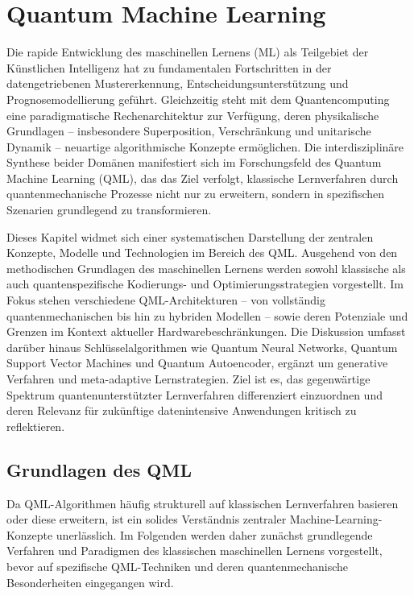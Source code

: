 \chapter{Quantum Machine Learning}



Die rapide Entwicklung des maschinellen Lernens (ML) als Teilgebiet der Künstlichen Intelligenz hat zu fundamentalen Fortschritten in der datengetriebenen Mustererkennung, Entscheidungsunterstützung und Prognosemodellierung geführt. Gleichzeitig steht mit dem Quantencomputing eine paradigmatische Rechenarchitektur zur Verfügung, deren physikalische Grundlagen – insbesondere Superposition, Verschränkung und unitarische Dynamik – neuartige algorithmische Konzepte ermöglichen. Die interdisziplinäre Synthese beider Domänen manifestiert sich im Forschungsfeld des Quantum Machine Learning (QML), das das Ziel verfolgt, klassische Lernverfahren durch quantenmechanische Prozesse nicht nur zu erweitern, sondern in spezifischen Szenarien grundlegend zu transformieren.


Dieses Kapitel widmet sich einer systematischen Darstellung der zentralen Konzepte, Modelle und Technologien im Bereich des QML. Ausgehend von den methodischen Grundlagen des maschinellen Lernens werden sowohl klassische als auch quantenspezifische Kodierungs- und Optimierungsstrategien vorgestellt. Im Fokus stehen verschiedene QML-Architekturen – von vollständig quantenmechanischen bis hin zu hybriden Modellen – sowie deren Potenziale und Grenzen im Kontext aktueller Hardwarebeschränkungen. Die Diskussion umfasst darüber hinaus Schlüsselalgorithmen wie Quantum Neural Networks, Quantum Support Vector Machines und Quantum Autoencoder, ergänzt um generative Verfahren und meta-adaptive Lernstrategien. Ziel ist es, das gegenwärtige Spektrum quantenunterstützter Lernverfahren differenziert einzuordnen und deren Relevanz für zukünftige datenintensive Anwendungen kritisch zu reflektieren.


\section{Grundlagen des QML}
Da QML-Algorithmen häufig strukturell auf klassischen Lernverfahren basieren oder diese erweitern, ist ein solides Verständnis zentraler Machine-Learning-Konzepte unerlässlich. Im Folgenden werden daher zunächst grundlegende Verfahren und Paradigmen des klassischen maschinellen Lernens vorgestellt, bevor auf spezifische QML-Techniken und deren quantenmechanische Besonderheiten eingegangen wird.

